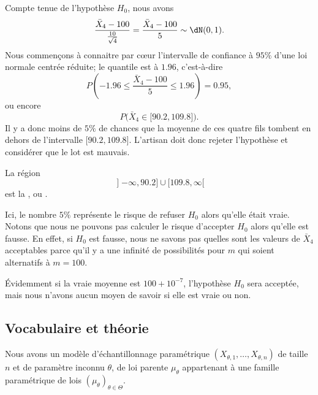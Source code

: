 Compte tenue de l'hypothèse \( H_0\), nous avons
\begin{equation}
	\frac{ \bar X_4-100 }{ \frac{ 10 }{ \sqrt{4} } }=\frac{ \bar X_4-100 }{ 5 }\sim\dN(0,1).
\end{equation}
Nous commençons à connaitre par cœur l'intervalle de confiance à \( 95\%\) d'une loi normale centrée réduite; le quantile est à \( 1.96\), c'est-à-dire
\begin{equation}
	P\left( -1.96\leq\frac{ \bar X_4-100 }{ 5 }\leq 1.96 \right)=0.95,
\end{equation}
ou encore
\begin{equation}
	P\big( \bar X_4\in\mathopen[ 90.2 , 109.8 \mathclose] \big).
\end{equation}
Il y a donc moins de \( 5\%\) de chances que la moyenne de ces quatre fils tombent en dehors de l'intervalle \( \mathopen[ 90.2 , 109.8 \mathclose]\). L'artisan doit donc rejeter l'hypothèse et considérer que le lot est mauvais.

La région
\begin{equation}
	\mathopen] -\infty , 90.2 \mathclose]\cup\mathopen[ 109.8 , \infty [
\end{equation}
est la , ou .

Ici, le nombre \( 5\%\) représente le risque de refuser \( H_0\) alors qu'elle était vraie. Notons que nous ne pouvons pas calculer le risque d'accepter \( H_0\) alors qu'elle est fausse. En effet, si \( H_0\) est fausse, nous ne savons pas quelles sont les valeurs de \( \bar X_4\) acceptables parce qu'il y a une infinité de possibilités pour \( m\) qui soient alternatifs à \( m=100\).

Évidemment si la vraie moyenne est \( 100+10^{-7}\), l'hypothèse \( H_0\) sera acceptée, mais nous n'avons aucun moyen de savoir si elle est vraie ou non.

\subsection{Vocabulaire et théorie}

Nous avons un modèle d'échantillonnage paramétrique \(  (X_{\theta,1},\ldots,X_{\theta,n})  \) de taille \( n\) et de paramètre inconnu \( \theta\), de loi parente \( \mu_{\theta}\) appartenant à une famille paramétrique de lois \( (\mu_{\theta})_{\theta\in\Theta}\).

